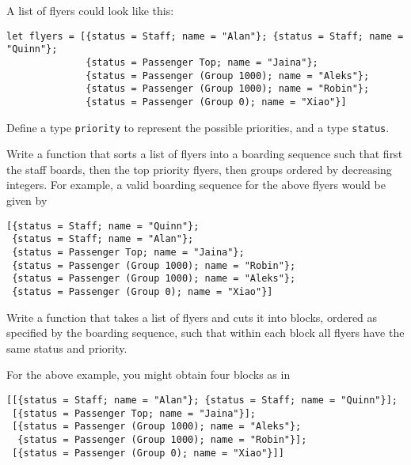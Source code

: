 \documentclass[arhiv]{../izpit}
\begin{document}
A list of flyers could look like this:
\begin{verbatim}
let flyers = [{status = Staff; name = "Alan"}; {status = Staff; name = "Quinn"};
              {status = Passenger Top; name = "Jaina"};
              {status = Passenger (Group 1000); name = "Aleks"};
              {status = Passenger (Group 1000); name = "Robin"};
              {status = Passenger (Group 0); name = "Xiao"}]
\end{verbatim}

Define a type \verb|priority| to represent the possible priorities, and a type \verb|status|.

\naloga

Write a function that sorts a list of flyers into a boarding sequence such that first the staff boards, then the top priority flyers, then groups ordered by decreasing integers. For example, a valid boarding sequence for the above flyers would be given by

\begin{verbatim}
[{status = Staff; name = "Quinn"};
 {status = Staff; name = "Alan"};
 {status = Passenger Top; name = "Jaina"};
 {status = Passenger (Group 1000); name = "Robin"};
 {status = Passenger (Group 1000); name = "Aleks"};
 {status = Passenger (Group 0); name = "Xiao"}]
\end{verbatim}

\naloga

Write a function that takes a list of flyers and cuts it into blocks, ordered as specified by the boarding sequence, such that within each block all flyers have the same status and priority.

For the above example, you might obtain four blocks as in
\begin{verbatim}
[[{status = Staff; name = "Alan"}; {status = Staff; name = "Quinn"}];
 [{status = Passenger Top; name = "Jaina"}];
 [{status = Passenger (Group 1000); name = "Aleks"};
  {status = Passenger (Group 1000); name = "Robin"}];
 [{status = Passenger (Group 0); name = "Xiao"}]]
\end{verbatim}
\end{document}
